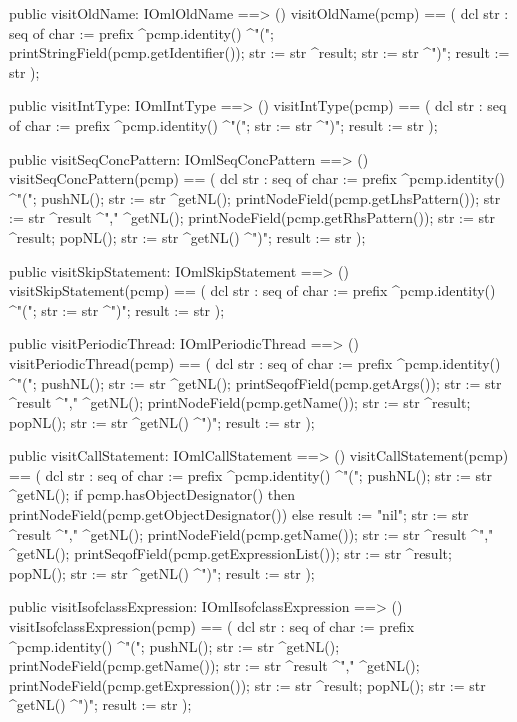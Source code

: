 \begin{vdm_al}
  public visitOldName: IOmlOldName ==> ()
  visitOldName(pcmp) ==
    ( dcl str : seq of char := prefix ^pcmp.identity() ^"(";
      printStringField(pcmp.getIdentifier());
      str := str ^result;
      str := str ^")";
      result := str );

  public visitIntType: IOmlIntType ==> ()
  visitIntType(pcmp) ==
    ( dcl str : seq of char := prefix ^pcmp.identity() ^"(";
      str := str ^")";
      result := str );

  public visitSeqConcPattern: IOmlSeqConcPattern ==> ()
  visitSeqConcPattern(pcmp) ==
    ( dcl str : seq of char := prefix ^pcmp.identity() ^"(";
      pushNL();
      str := str ^getNL();
      printNodeField(pcmp.getLhsPattern());
      str := str ^result ^"," ^getNL();
      printNodeField(pcmp.getRhsPattern());
      str := str ^result;
      popNL();
      str := str ^getNL() ^")";
      result := str );

  public visitSkipStatement: IOmlSkipStatement ==> ()
  visitSkipStatement(pcmp) ==
    ( dcl str : seq of char := prefix ^pcmp.identity() ^"(";
      str := str ^")";
      result := str );

  public visitPeriodicThread: IOmlPeriodicThread ==> ()
  visitPeriodicThread(pcmp) ==
    ( dcl str : seq of char := prefix ^pcmp.identity() ^"(";
      pushNL();
      str := str ^getNL();
      printSeqofField(pcmp.getArgs());
      str := str ^result ^"," ^getNL();
      printNodeField(pcmp.getName());
      str := str ^result;
      popNL();
      str := str ^getNL() ^")";
      result := str );

  public visitCallStatement: IOmlCallStatement ==> ()
  visitCallStatement(pcmp) ==
    ( dcl str : seq of char := prefix ^pcmp.identity() ^"(";
      pushNL();
      str := str ^getNL();
      if pcmp.hasObjectDesignator()
      then printNodeField(pcmp.getObjectDesignator())
      else result := "nil";
      str := str ^result ^"," ^getNL();
      printNodeField(pcmp.getName());
      str := str ^result ^"," ^getNL();
      printSeqofField(pcmp.getExpressionList());
      str := str ^result;
      popNL();
      str := str ^getNL() ^")";
      result := str );

  public visitIsofclassExpression: IOmlIsofclassExpression ==> ()
  visitIsofclassExpression(pcmp) ==
    ( dcl str : seq of char := prefix ^pcmp.identity() ^"(";
      pushNL();
      str := str ^getNL();
      printNodeField(pcmp.getName());
      str := str ^result ^"," ^getNL();
      printNodeField(pcmp.getExpression());
      str := str ^result;
      popNL();
      str := str ^getNL() ^")";
      result := str );


\end{vdm_al}
